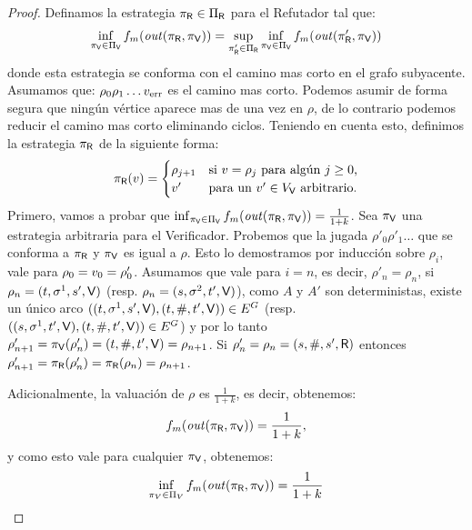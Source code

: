 \begin{proof}
	Definamos la estrategia $\pi_{\mathsf{R}} \in \Pi_{\mathsf{R}}$ para el Refutador tal que:
\[
	\inf_{\pi_{\mathsf{V}} \in \Pi_{\mathsf{V}}} f_m(\mathit{out}(\pi_{\mathsf{R}}, \pi_{\mathsf{V}})) = \sup_{\pi_{\mathsf{R}}' \in \Pi_{\mathsf{R}}} \inf_{\pi_{\mathsf{V}} \in \Pi_{\mathsf{V}}} f_m( \mathit{out}(\pi_{\mathsf{R}}',\pi_{\mathsf{V}}))
\]	
	donde esta estrategia se conforma con el camino mas corto en el grafo subyacente. Asumamos que: 
$\rho_0 \rho_1 \dots v_{\text{err}}$ es el camino mas corto. Podemos asumir de forma segura que ningún vértice aparece mas de una vez en $\rho$, de lo contrario podemos reducir el camino mas corto eliminando ciclos.
	Teniendo en cuenta esto, definimos la estrategia $\pi_{\mathsf{R}}$ de la siguiente forma:
\[
	\pi_{\mathsf{R}}(v) = \begin{cases}
								\rho_{j+1} & \text{si $v = \rho_j$ para algún $j \geq 0$,} \\
								v' & \text{para un $v' \in V_{\mathsf{V}}$ arbitrario.}
						   \end{cases}
\] 
Primero, vamos a probar que $\inf_{\pi_{\mathsf{V}} \in \Pi_{\mathsf{V}}} f_m (\mathit{out}(\pi_{\mathsf{R}}, \pi_{\mathsf{V}})) = \frac{1}{1+k}$. Sea $\pi_{\mathsf{V}}$ una estrategia arbitraria para el Verificador. Probemos que la jugada $\rho'_0 \rho'_1 \dots$ que se conforma a $\pi_{\mathsf{R}}$ y $\pi_{\mathsf{V}}$ es igual a $\rho$. Esto lo demostramos por inducción sobre $\rho_i$, vale para $\rho_0 = v_0 = \rho'_0$. Asumamos que vale para $i=n$, es decir, $\rho'_n = \rho_n$, si $\rho_n = (t, \sigma^1, s', \mathsf{V})$ (resp.  $\rho_n = (s, \sigma^2, t', \mathsf{V})$), como $A$ y $A'$ son deterministas, existe un único arco $((t, \sigma^1, s', \mathsf{V}), (t, \#, t', \mathsf{V})) \in E^G$ (resp. $((s, \sigma^1, t', \mathsf{V}), (t, \#, t', \mathsf{V})) \in E^G$) y por lo tanto  $\rho'_{n+1} = \pi_{\mathsf{V}}( \rho'_n) = (t, \#, t', \mathsf{V}) = \rho_{n+1}$. Si 
$\rho'_n = \rho_n = (s, \#, s', \mathsf{R})$ entonces $\rho'_{n+1} = \pi_{\mathsf{R}}(\rho'_n) = \pi_{\mathsf{R}}(\rho_n) = \rho_{n+1}$. 
	
Adicionalmente, la valuación de $\rho$ es $\frac{1}{1+k}$, es decir, obtenemos:
\begin{equation} \label{eq1}
\begin{split}
 f_m (\mathit{out}(\pi_{\mathsf{R}}, \pi_{\mathsf{V}}))  =  \frac{1}{1+k},
\end{split}
\end{equation}	
y como esto vale para cualquier $\pi_{\mathsf{V}}$, obtenemos:
\begin{equation} \label{eq2}
\begin{split}
\inf_{\pi_V \in \Pi_V} f_m (\mathit{out}(\pi_{\mathsf{R}}, \pi_{\mathsf{V}}))  =  \frac{1}{1+k}
\end{split}
\end{equation}


\end{proof}
